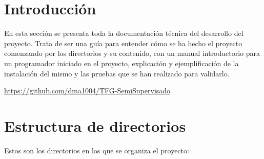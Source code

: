 
\section{Introducción}
En esta sección se presenta toda la documentación técnica del desarrollo del
proyecto. Trata de ser una guía para entender cómo se ha hecho el proyecto
comenzando por los directorios y su contenido, con un manual introductorio para
un programador iniciado en el proyecto, explicación y ejemplificación de la
instalación del mismo y las pruebas que se han realizado para validarlo.

\begin{tcolorbox}[enhanced,title=Repositorio Github,
frame style={left color=blue!75!black,
right color=cyan!75!black}]
\url{https://github.com/dma1004/TFG-SemiSupervisado}
\end{tcolorbox}

\section{Estructura de directorios}
Estos son los directorios en los que se organiza el proyecto:


